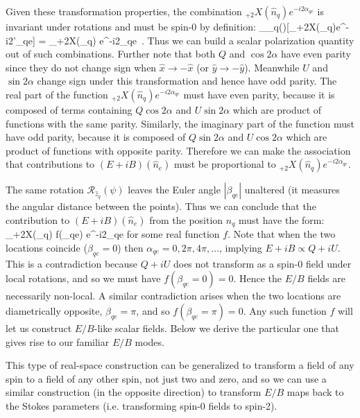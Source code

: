 Given these transformation properties, the combination ${}_{+2}X(\hat{n}_q)e^{-i2\alpha_{qe}}$ is invariant under rotations and must be spin-0 by definition:
\beq
{}_{_q}(\psi)[{}_{+2}X(_q)e^{-i2\alpha'_{qe}}] = {}_{+2}X(_q) e^{-i2\alpha_{qe}} \,. \label{eq:invariant}
\eeq
Thus we can build a scalar polarization quantity out of such combinations.
Further note that both $Q$ and $\cos2 \alpha$ have even parity since they do not change sign when $\hat{x} \rightarrow -\hat{x}$ (or $\hat{y} \rightarrow -\hat{y}$).  Meanwhile $U$ and $\sin 2 \alpha$ change sign under this transformation and hence have odd parity. The real part of the function  ${}_{+2}X(\hat{n}_q)e^{-i2\alpha_{qe}}$ must have even parity, because it is composed of terms containing $Q\cos{2\alpha}$ and  $U\sin{2 \alpha}$ which are product of functions with the same parity. Similarly, the imaginary part of the function must have odd parity, because it is composed of $Q\sin{2 \alpha}$ and $U\cos{2\alpha}$ which are product of functions with opposite parity.  Therefore we can make the association that contributions to  $(E+iB)(\hat n_e)$ must be proportional to $ {}_{+2}X(\hat{n}_q) e^{-i2\alpha_{qe}}$.


The same rotation $\mathcal{R}_{\hat{z}_q}(\psi)$ leaves the Euler angle $|\beta_{qe}|$ unaltered (it measures the angular distance between the points).  Thus we can conclude that the contribution to $(E+iB)(\hat n_e)$ from the position $n_q$ must have the form:
\beq
{}_{+2}X(_q) f(\beta_{qe})  e^{-i2\alpha_{qe}}
\eeq
for some real function $f$.  Note that when the two locations coincide ($\beta_{qe}=0$) then  $\alpha_{qe}=0,2\pi,4\pi,\dots$, implying $E + iB \propto Q+iU$.  This is a contradiction because $Q+iU$ does not transform as a spin-0 field under local rotations, and so we must have $f(\beta_{qe} = 0 ) = 0$.   Hence the $E/B$ fields are necessarily non-local.  A similar contradiction arises when the two locations are diametrically opposite, $\beta_{qe} = \pi$, and so $f(\beta_{qe} = \pi ) = 0$.  Any such function $f$ will let us construct $E/B$-like scalar fields.  Below we derive the particular one that gives rise to our familiar $E/B$ modes.

This type of real-space construction can be generalized to transform a field of any spin to a field of any other spin, not just two and zero, and so we can use a similar construction (in the opposite direction) to transform $E/B$ maps back to the Stokes parameters (i.e. transforming spin-0 fields to spin-2).

